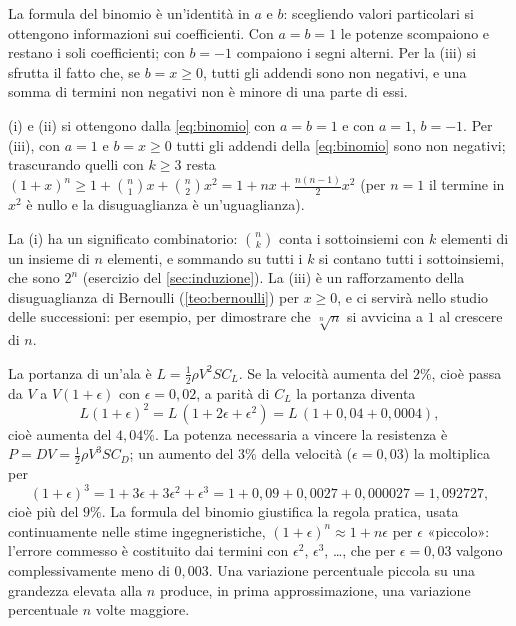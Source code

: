 \begin{schema}
\end{schema}

\begin{strategia}
La formula del binomio è un'identità in $a$ e $b$: scegliendo valori particolari si
ottengono informazioni sui coefficienti. Con $a=b=1$ le potenze scompaiono e restano i
soli coefficienti; con $b=-1$ compaiono i segni alterni. Per la (iii) si sfrutta il
fatto che, se $b=x\ge0$, tutti gli addendi sono non negativi, e una somma di termini non
negativi non è minore di una parte di essi.
\end{strategia}

\begin{dimostrazione}
(i) e (ii) si ottengono dalla \eqref{eq:binomio} con $a=b=1$ e con $a=1$, $b=-1$. Per
(iii), con $a=1$ e $b=x\ge0$ tutti gli addendi della \eqref{eq:binomio} sono non
negativi; trascurando quelli con $k\ge3$ resta
$(1+x)^{n}\ge1+\binom n1x+\binom n2x^{2}=1+nx+\frac{n(n-1)}2x^{2}$ (per $n=1$ il
termine in $x^{2}$ è nullo e la disuguaglianza è un'uguaglianza).
\end{dimostrazione}

\begin{osservazione}
La (i) ha un significato combinatorio: $\binom nk$ conta i sottoinsiemi con $k$
elementi di un insieme di $n$ elementi, e sommando su tutti i $k$ si contano tutti i
sottoinsiemi, che sono $2^{n}$ (esercizio del \cref{sec:induzione}). La (iii) è un
rafforzamento della disuguaglianza di Bernoulli (\cref{teo:bernoulli}) per $x\ge0$, e
ci servirà nello studio delle successioni: per esempio, per dimostrare che
$\sqrt[n]{n}$ si avvicina a $1$ al crescere di $n$.
\end{osservazione}

\begin{esempio}\label{es:sensibilita}
La portanza di un'ala è $L=\frac12\rho V^{2}SC_{L}$. Se la velocità aumenta del $2\%$,
cioè passa da $V$ a $V(1+\epsilon)$ con $\epsilon=0{,}02$, a parità di $C_{L}$ la
portanza diventa
\[
  L(1+\epsilon)^{2}=L\,(1+2\epsilon+\epsilon^{2})=L\,(1+0{,}04+0{,}0004),
\]
cioè aumenta del $4{,}04\%$. La potenza necessaria a vincere la resistenza è
$P=DV=\frac12\rho V^{3}SC_{D}$; un aumento del $3\%$ della velocità ($\epsilon=0{,}03$)
la moltiplica per
\[
  (1+\epsilon)^{3}=1+3\epsilon+3\epsilon^{2}+\epsilon^{3}=1+0{,}09+0{,}0027+0{,}000027
  =1{,}092727,
\]
cioè più del $9\%$. La formula del binomio giustifica la regola pratica, usata
continuamente nelle stime ingegneristiche, $(1+\epsilon)^{n}\approx1+n\epsilon$ per
$\epsilon$ «piccolo»: l'errore commesso è costituito dai termini con $\epsilon^{2}$,
$\epsilon^{3}$, \dots, che per $\epsilon=0{,}03$ valgono complessivamente meno di
$0{,}003$. Una variazione percentuale piccola su una grandezza elevata alla $n$ produce,
in prima approssimazione, una variazione percentuale $n$ volte maggiore.
\end{esempio}

